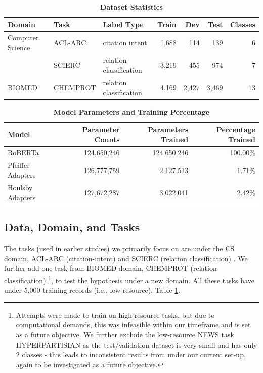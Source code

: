 \documentclass[10pt,twocolumn,letterpaper]{article}
\begin{document}
\begin{table}[t]
  \centering
  
  \begin{tabular}{ l l l r r r r }
    \hline
    \textbf{Domain} & \textbf{Task} & \textbf{Label Type} & \textbf{Train} & \textbf{Dev}   & \textbf{Test}  & \textbf{Classes} \\
    \hline
    Computer Science & ACL-ARC & citation intent & 1,688 & 114   & 139   & 6 \\
                     & SCIERC  & relation classification & 3,219 & 455   & 974   & 7 \\
    \hline
    BIOMED           & CHEMPROT & relation classification & 4,169 & 2,427 & 3,469 & 13 \\
    \hline
  \end{tabular}%
  \caption{\textbf{Dataset Statistics}}
  \label{tab:dataset-stats}%
\end{table}%

\begin{table}[htbp]
    \centering
    
    \begin{tabular}{ l r r r }
        \hline
        \textbf{Model} & \textbf{Parameter Counts} & \textbf{Parameters Trained} & \textbf{Percentage Trained} \\
        \hline
        RoBERTa & 124,650,246 & 124,650,246 & 100.00\% \\
        Pfeiffer Adapters & 126,777,759 & 2,127,513 & 1.71\% \\
        Houlsby Adapters & 127,672,287 & 3,022,041 & 2.42\% \\
        \hline
    \end{tabular}
    \caption{\textbf{Model Parameters and Training Percentage}}
    \label{tab:model-parameters}
\end{table}

\subsection{Data, Domain, and Tasks} The tasks (used in earlier studies\cite{gururangan2020dont}) we primarily focus on are under the CS domain, ACL-ARC (citation-intent) and SCIERC (relation classification) . We further add one task from BIOMED domain, CHEMPROT (relation classification) \footnote{Attempts were made to train on high-resource tasks, but due to computational demands, this was infeasible within our timeframe and is set as a future objective. We further exclude the low-resource NEWS task HYPERPARTISIAN as the test/validation dataset is very small and has only 2 classes - this leads to inconsistent results from \cite{allenai_dont_stop_pretraining} under our current set-up, again to be investigated as a future objective.}, to test the hypothesis under a new domain. All these tasks have under 5,000 training records (i.e., low-resource). Table \ref{tab:dataset-stats}.
\end{document}
